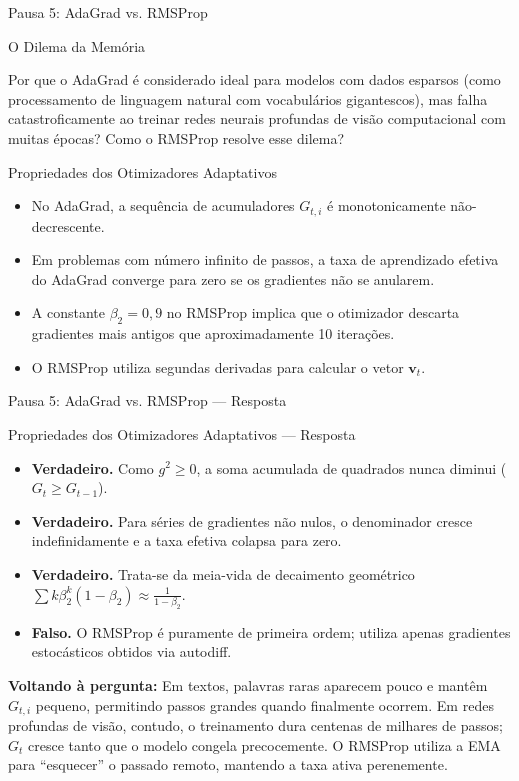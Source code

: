\documentclass[aspectratio=169, 10pt]{beamer}
\newenvironment{callouttip}[1][Dica]{%
  \begin{exampleblock}{#1}%
}{%
  \end{exampleblock}%
}
\newcommand{\cmark}{\textcolor{green!60!black}{\textbf{\ding{51}}}}
\newcommand{\xmark}{\textcolor{red!70!black}{\textbf{\ding{55}}}}
\newcommand{\qmark}{\textbf{$\square$}}
\begin{document}
\begin{frame}{Pausa 5: AdaGrad vs. RMSProp}
  \begin{callouttip}[O Dilema da Memória]
    Por que o AdaGrad é considerado ideal para modelos com dados esparsos (como processamento de linguagem natural com vocabulários gigantescos), mas falha catastroficamente ao treinar redes neurais profundas de visão computacional com muitas épocas? Como o RMSProp resolve esse dilema?
  \end{callouttip}

  \begin{callouttip}[Propriedades dos Otimizadores Adaptativos]
    \begin{itemize}
      \item[\qmark] No AdaGrad, a sequência de acumuladores $G_{t, i}$ é monotonicamente não-decrescente.
      \item[\qmark] Em problemas com número infinito de passos, a taxa de aprendizado efetiva do AdaGrad converge para zero se os gradientes não se anularem.
      \item[\qmark] A constante $\beta_2 = 0{,}9$ no RMSProp implica que o otimizador descarta gradientes mais antigos que aproximadamente 10 iterações.
      \item[\qmark] O RMSProp utiliza segundas derivadas para calcular o vetor $\mathbf{v}_t$.
    \end{itemize}
  \end{callouttip}
\end{frame}

\begin{frame}{Pausa 5: AdaGrad vs. RMSProp --- Resposta}
  \begin{callouttip}[Propriedades dos Otimizadores Adaptativos --- Resposta]
    \begin{itemize}
      \item[\cmark] \textbf{Verdadeiro.} Como $g^2 \ge 0$, a soma acumulada de quadrados nunca diminui ($G_t \ge G_{t-1}$).
      \item[\cmark] \textbf{Verdadeiro.} Para séries de gradientes não nulos, o denominador cresce indefinidamente e a taxa efetiva colapsa para zero.
      \item[\cmark] \textbf{Verdadeiro.} Trata-se da meia-vida de decaimento geométrico $\sum k \beta_2^k (1-\beta_2) \approx \frac{1}{1-\beta_2}$.
      \item[\xmark] \textbf{Falso.} O RMSProp é puramente de primeira ordem; utiliza apenas gradientes estocásticos obtidos via autodiff.
    \end{itemize}
  \end{callouttip}
  \vspace{0.2cm}
  \textbf{Voltando à pergunta:} Em textos, palavras raras aparecem pouco e mantêm $G_{t, i}$ pequeno, permitindo passos grandes quando finalmente ocorrem. Em redes profundas de visão, contudo, o treinamento dura centenas de milhares de passos; $G_t$ cresce tanto que o modelo congela precocemente. O RMSProp utiliza a EMA para ``esquecer'' o passado remoto, mantendo a taxa ativa perenemente.
\end{frame}
\end{document}
